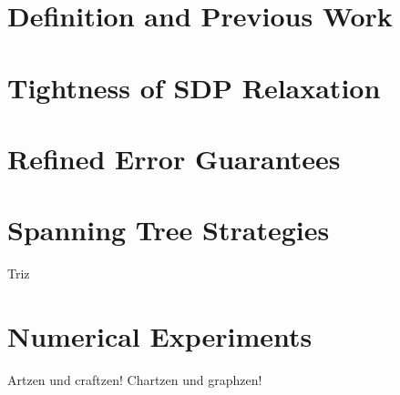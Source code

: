 \label{ch:ang_sync}
\section{Definition and Previous Work}


\section{Tightness of SDP Relaxation}
\label{sec:ang_sync_sdp}


\section{Refined Error Guarantees}
\label{sec:ang_sync_improve}


\section{Spanning Tree Strategies}
\label{sec:ang_sync_tree}
Triz
%

\section{Numerical Experiments}
\label{sec:ang_sync_num}
Artzen und craftzen!  Chartzen und graphzen!
